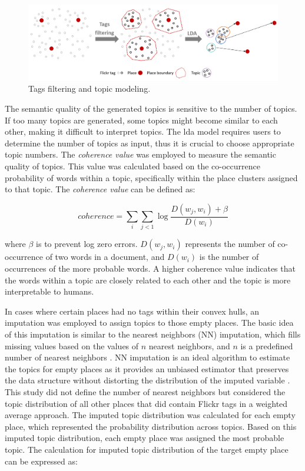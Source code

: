 \documentclass{article}
\theoremstyle{remark}
\begin{document}
\begin{figure} [!h]
\centering
\includegraphics[width=1\textwidth]{figures/topic_modeling_methodology.png}
\caption{\label{fig:topic_modeling_methodology}Tags filtering and topic modeling.}
\end{figure}

The semantic quality of the generated topics is sensitive to the number of topics. If too many topics are generated, some topics might become similar to each other, making it difficult to interpret topics. The \acrshort{lda} model requires users to determine the number of topics as input, thus it is crucial to choose appropriate topic numbers. The \textit{coherence value} was employed to measure the semantic quality of topics. This value was calculated based on the co-occurrence probability of words within a topic, specifically within the place clusters assigned to that topic. The \textit{coherence value} can be defined as:

\begin{equation} \label{eq:coherence_value}
    coherence = \sum_{i}\sum_{j<1}\log\frac{D(w_{j},w_{i})+\beta}{D(w_{i})}
\end{equation}

where $\beta$ is to prevent log zero errors. $D(w_{j},w_{i})$ represents the number of co-occurrence of two words in a document, and $D(w_{i})$ is the number of occurrences of the more probable words. A higher coherence value indicates that the words within a topic are closely related to each other and the topic is more interpretable to humans.

In cases where certain places had no tags within their convex hulls, an imputation was employed to assign topics to those empty places. The basic idea of this imputation is similar to the nearest neighbors (NN) imputation, which fills missing values based on the values of $n$ nearest neighbors, and $n$ is a predefined number of nearest neighbors \citep{troyanskaya_missing_2001}. NN imputation is an ideal algorithm to estimate the topics for empty places as it provides an unbiased estimator that preserves the data structure without distorting the distribution of the imputed variable \citep{beretta_nearest_2016}. This study did not define the number of nearest neighbors but considered the topic distribution of all other places that did contain Flickr tags in a weighted average approach. The imputed topic distribution was calculated for each empty place, which represented the probability distribution across topics. Based on this imputed topic distribution, each empty place was assigned the most probable topic. The calculation for imputed topic distribution of the target empty place can be expressed as:
\end{document}
